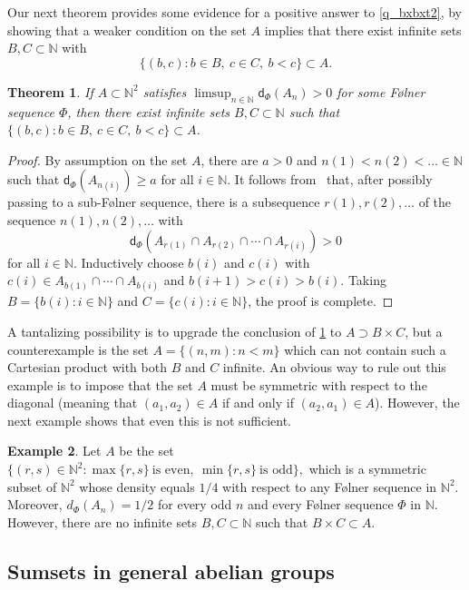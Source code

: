 \documentclass[10pt,dvipsnames]{article}
\newtheorem{theorem}{Theorem}[section]
\theoremstyle{definition}
\newtheorem{example}[theorem]{Example}
\theoremstyle{plain}
\newcommand{\N}{\mathbb{N}}
\newcommand{\dens}{\mathsf{d}}
\newcommand{\Folner}{F\o{}lner}
\begin{document}
Our next theorem provides some evidence for a positive answer to \cref{q_bxbxt2}, by showing that a weaker condition on the set $A$ implies that there exist infinite sets $B,C \subset \N$ with
\[
\{(b,c): b\in B,~c\in C,~b<c\} \subset A.
\]


\begin{theorem}
\label{q_bxc_restircted}
If $A\subset\N^2$ satisfies $\limsup_{n\in\N} \dens_\Phi(A_n) >0$ for some \Folner{} sequence $\Phi$, 
then there exist infinite sets $B,C\subset\N$ such that $\{(b,c): b\in B,~c\in C,~b<c\}\subset A$.
\end{theorem}

\begin{proof}
By assumption on the set $A$,  there are $a > 0$ and $n(1)<n(2)<\ldots\in\N$ such that $\dens_\Phi(A_{n(i)}) \ge a$ for all $i \in \N$.
It follows from~\cite[Theorem~2.1]{bergelson} that, after possibly passing to a sub-\Folner{} sequence, there is a subsequence $r(1), r(2), \ldots$ of the sequence $n(1),n(2),\ldots$ with
\[
\dens_\Phi(A_{r(1)} \cap A_{r(2)} \cap \cdots \cap A_{r(i)}) > 0
\]
for all $i \in \N$.
Inductively choose $b(i)$ and $c(i)$ with $c(i) \in A_{b(1)} \cap \cdots \cap A_{b(i)}$ and $b(i+1) > c(i) > b(i)$.
Taking $B = \{b(i) : i \in \N\}$ and $C = \{ c(i) : i \in \N \}$, the proof is complete.
\end{proof}

A tantalizing possibility is to upgrade the conclusion of \cref{q_bxc_restircted} to $A\supset B\times C$, but a counterexample is  the set $A=\{(n,m):n<m\}$ which can not contain such a Cartesian product with both $B$ and $C$  infinite.
An obvious way to rule out this example is to impose that the set $A$ must be symmetric with respect to the diagonal (meaning that $(a_1,a_2)\in A$ if and only if $(a_2,a_1)\in A$).  
However, the next example shows that even this is not sufficient.

\begin{example}\label{example_evenoddproduct}
Let $A$ be the set
$
\big\{(r,s)\in\N^2: \max\{r,s\}~\text{is even},~\min\{r,s\}~\text{is odd}\big\},
$
which is a symmetric subset of $\N^2$ whose density equals $1/4$ with respect to any \Folner{} sequence in $\N^2$. 
Moreover, $d_\Phi(A_n)=1/2$ for every odd $n$ and every F\o lner sequence $\Phi$ in $\N$.
However, there are no infinite sets $B,C \subset \N$ such that $B \times C\subset A$.
\end{example}


\subsection{Sumsets in general abelian groups}
\end{document}
